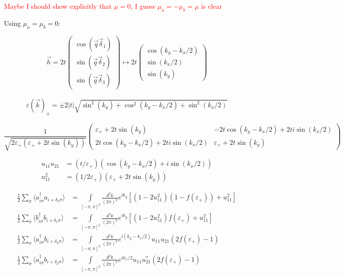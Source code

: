 \documentclass[../../../main.tex]{subfiles}
\begin{document}
\textcolor{red}{Maybe I should show explicitly that $\mu = 0$, I guess $\mu_a = - \mu_b = \mu$ is clear}

Using $\mu_a = \mu_b = 0$:

\begin{equation}
	\vec{h} = 2t
	\begin{pmatrix}
		\cos(\vec{q}\vec{\delta}_1) \\
		\sin(\vec{q}\vec{\delta}_2) \\
		\sin(\vec{q}\vec{\delta}_3)
	\end{pmatrix} \mapsto 2t
	\begin{pmatrix}
		\cos(k_y-k_x/2) \\
		\sin(k_x/2) \\
		\sin(k_y) 
	\end{pmatrix}
\end{equation}

\begin{gather}
	\varepsilon(\vec{k})_{\pm} = \pm 2|t|\sqrt{\sin^2(k_y) +\cos^2(k_y-k_x/2) + \sin^2(k_x/2)}
\end{gather}

\begin{equation}
\frac{1}{\sqrt{2\varepsilon_{+}(\varepsilon_+ + 2t\sin(k_y))}}
\begin{pmatrix}
\varepsilon_+ + 2t\sin(k_y) &-2t\cos(k_y - k_x/2) + 2ti\sin(k_x/2) \\
2t\cos(k_y-k_x/2) + 2ti\sin(k_x/2) &\varepsilon_+ + 2t\sin(k_y) 
\end{pmatrix}
\end{equation}


\begin{align}
	u_{11}u_{21} &= (t/\varepsilon_+)(\cos(k_y-k_x/2) + i \sin(k_x/2)) \\
	u_{11}^2 &= (1/2\varepsilon_+)(\varepsilon_+ + 2t\sin(k_y))
\end{align}


\begin{align}
	\frac12	\sum_\sigma\langle a_{i\sigma}^\dagger a_{i+\delta_1\sigma } \rangle &= \int\limits_{[-\pi,\pi]^2}  \frac{d^2k}{(2\pi)^2} e^{i k_y} \left[(1-2u_{11}^2)(1-f(\varepsilon_+)) + u_{11}^2\right] \\
	\frac12 \sum_\sigma \langle b_{i\sigma}^\dagger b_{i+\delta_1\sigma} \rangle &= \int\limits_{[-\pi,\pi]^2} \frac{d^2k}{(2\pi)^2} e^{i k_y} \left[(1-2u_{11}^2)f(\varepsilon_+) + u_{11}^2\right] \\
	\frac12 \sum_\sigma \langle a_{i\sigma}^\dagger b_{i+\delta_3\sigma} \rangle &= \int\limits_{[-\pi,\pi]^2} \frac{d^2k}{(2\pi)^2} e^{i(k_y-k_x/2)}u_{11}u_{21}(2f(\varepsilon_+) -1) \\
	\frac12 \sum_\sigma \langle a_{i\sigma}^\dagger b_{i+\delta_2\sigma} \rangle &= \int\limits_{[-\pi, \pi]^2} \frac{d^2k}{(2\pi)^2} e^{ik_x/2} u_{11}u_{21}^*(2f(\varepsilon_+)-1)
\end{align}
\end{document}
